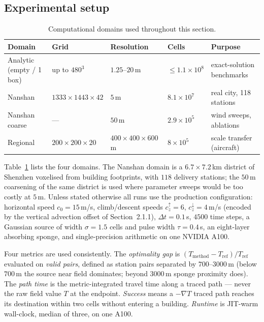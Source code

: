 \subsection{Experimental setup}
\label{sec:setup}

\begin{table}[t]
\centering
\caption{Computational domains used throughout this section.}
\label{tab:domains}
\small
\begin{tabular}{lllll}
\toprule
Domain & Grid & Resolution & Cells & Purpose \\
\midrule
Analytic (empty / 1 box) & up to $480^3$ & $1.25$--$20\,$m & $\le 1.1\times10^8$ & exact-solution benchmarks \\
Nanshan & $1333\times1443\times42$ & $5\,$m & $8.1\times10^7$ & real city, 118 stations \\
Nanshan coarse & --- & $50\,$m & $2.9\times10^5$ & wind sweeps, ablations \\
Regional & $200\times200\times20$ & $400\times400\times600\,$m & $8\times10^5$ & scale transfer (aircraft) \\
\bottomrule
\end{tabular}
\end{table}

Table~\ref{tab:domains} lists the four domains. The Nanshan domain is
a $6.7\times7.2\,$km district of Shenzhen voxelised from building
footprints, with $118$ delivery stations; the $50\,$m coarsening of
the same district is used where parameter sweeps would be too costly
at $5\,$m. Unless stated otherwise all runs use the production
configuration: horizontal speed $c_0 = 15\,$m/s, climb/descent speeds
$c_z^{\uparrow}=6$, $c_z^{\downarrow}=4\,$m/s (encoded by the vertical
advection offset of Section~2.1.1), $\Delta t = 0.1\,$s, $4500$ time
steps, a Gaussian source of width $\sigma = 1.5$ cells and pulse
width $\tau = 0.4\,$s, an eight-layer absorbing sponge, and
single-precision arithmetic on one NVIDIA A100.

Four metrics are used consistently. The \emph{optimality gap} is
$(T_{\mathrm{method}} - T_{\mathrm{ref}})/T_{\mathrm{ref}}$ evaluated
on \emph{valid pairs}, defined as station pairs separated by
$700$--$3000\,$m (below $700\,$m the source near field dominates;
beyond $3000\,$m sponge proximity does). The \emph{path time} is the
metric-integrated travel time along a traced path --- never the raw
field value $T$ at the endpoint. \emph{Success} means a
$-\nabla T$ traced path reaches its destination within two cells
without entering a building. \emph{Runtime} is JIT-warm wall-clock,
median of three, on one A100.

